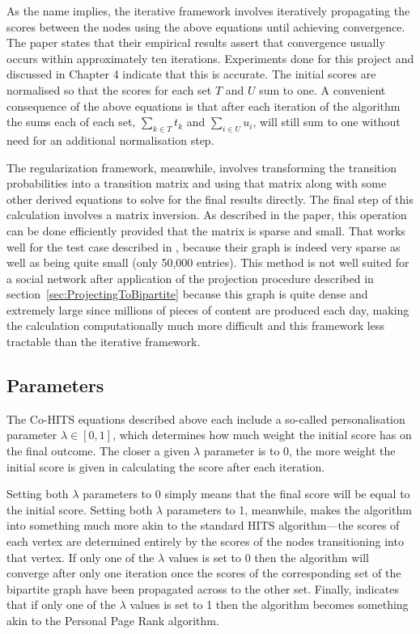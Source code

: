 As the name implies, the iterative framework involves iteratively propagating the scores between the nodes using the above equations until achieving convergence. The paper states that their empirical results assert that convergence usually occurs within approximately ten iterations. Experiments done for this project and discussed in Chapter 4 indicate that this is accurate. The initial scores are normalised so that the scores for each set $T$ and $U$ sum to one. A convenient consequence of the above equations is that after each iteration of the algorithm the sums each of each set, $\sum\limits_{k \in T} t_{k}$ and $\sum\limits_{i \in U} u_{i}$, will still sum to one without need for an additional normalisation step.

The regularization framework, meanwhile, involves transforming the transition probabilities into a transition matrix and using that matrix along with some other derived equations to solve for the final results directly. The final step of this calculation involves a matrix inversion. As described in the paper, this operation can be done efficiently provided that the matrix is sparse and small. That works well for the test case described in \cite{Deng2009}, because their graph is indeed very sparse as well as being quite small (only 50,000 entries). This method is not well suited for a social network after application of the projection procedure described in section~\ref{sec:ProjectingToBipartite} because this graph is quite dense and extremely large since millions of pieces of content are produced each day, making the calculation computationally much more difficult and this framework less tractable than the iterative framework.


\subsection{Parameters}
\label{sec:CoHitsParameters}

The Co-HITS equations described above each include a so-called personalisation parameter $\lambda \in [0,1]$, which determines how much weight the initial score has on the final outcome. The closer a given $\lambda$ parameter is to 0, the more weight the initial score is given in calculating the score after each iteration.

Setting both $\lambda$ parameters to 0 simply means that the final score will be equal to the initial score. Setting both $\lambda$ parameters to 1, meanwhile, makes the algorithm into something much more akin to the standard HITS algorithm---the scores of each vertex are determined entirely by the scores of the nodes transitioning into that vertex. If only one of the $\lambda$ values is set to 0 then the algorithm will converge after only one iteration once the scores of the corresponding set of the bipartite graph have been propagated across to the other set. Finally, \cite{Deng2009} indicates that if only one of the $\lambda$ values is set to 1 then the algorithm becomes something akin to the Personal Page Rank algorithm.

